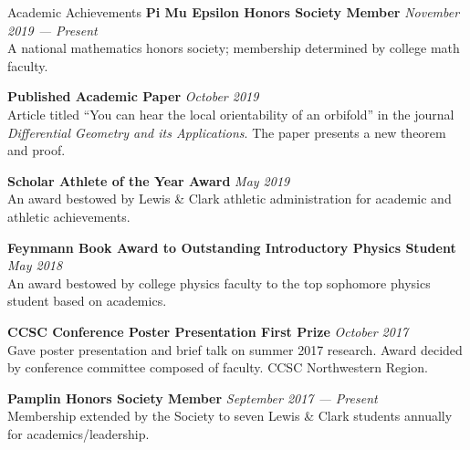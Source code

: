 \documentclass{resume}
\begin{document}
\begin{rSection}{Academic Achievements} 
    \textbf{Pi Mu Epsilon Honors Society Member} \hfill \textit{November 2019 --- Present}\\
 A national mathematics honors society; membership determined by college math faculty.

	\textbf{Published Academic Paper} \hfill \textit{October 2019} \\
Article titled ``You can hear the local orientability of an orbifold'' in the journal \textit{Differential Geometry and its Applications}. The paper presents a new theorem and proof.

    \textbf{Scholar Athlete of the Year Award} \hfill \textit{May 2019}\\ 
An award bestowed by Lewis \& Clark athletic administration for academic and athletic achievements.

    \textbf{Feynmann Book Award to Outstanding Introductory Physics Student}
	\hfill \textit{May 2018}\\
    An award bestowed by college physics faculty to the top sophomore physics student based on academics.

    \textbf{CCSC Conference Poster Presentation First Prize} \hfill \textit{October 2017}\\
    Gave poster presentation and brief talk on summer 2017 research. Award decided by conference committee composed of faculty. CCSC Northwestern Region.

    \textbf{Pamplin Honors Society Member} \hfill \textit{September 2017 --- Present} \\
 Membership extended by the Society to seven Lewis \& Clark students annually for academics/leadership.

\end{rSection}

%
%
%
\end{document}
